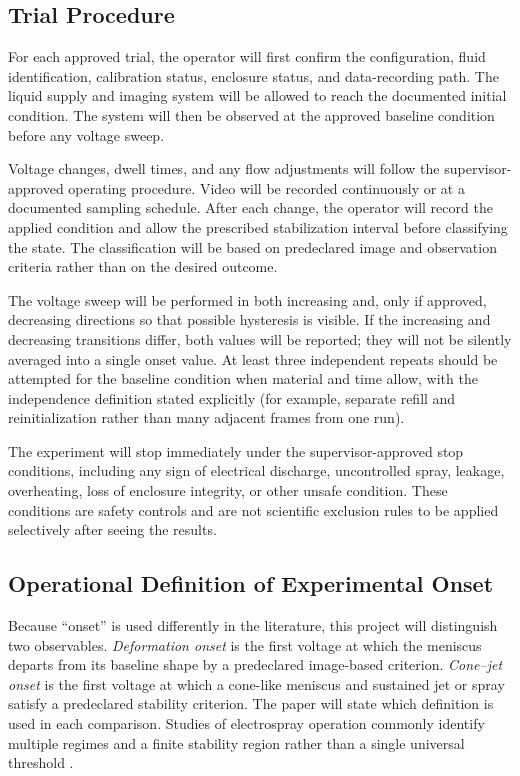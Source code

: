 \subsection{Trial Procedure}

For each approved trial, the operator will first confirm the configuration, fluid identification, calibration status, enclosure status, and data-recording path. The liquid supply and imaging system will be allowed to reach the documented initial condition. The system will then be observed at the approved baseline condition before any voltage sweep.

Voltage changes, dwell times, and any flow adjustments will follow the supervisor-approved operating procedure. Video will be recorded continuously or at a documented sampling schedule. After each change, the operator will record the applied condition and allow the prescribed stabilization interval before classifying the state. The classification will be based on predeclared image and observation criteria rather than on the desired outcome.

The voltage sweep will be performed in both increasing and, only if approved, decreasing directions so that possible hysteresis is visible. If the increasing and decreasing transitions differ, both values will be reported; they will not be silently averaged into a single onset value. At least three independent repeats should be attempted for the baseline condition when material and time allow, with the independence definition stated explicitly (for example, separate refill and reinitialization rather than many adjacent frames from one run).

The experiment will stop immediately under the supervisor-approved stop conditions, including any sign of electrical discharge, uncontrolled spray, leakage, overheating, loss of enclosure integrity, or other unsafe condition. These conditions are safety controls and are not scientific exclusion rules to be applied selectively after seeing the results.

\subsection{Operational Definition of Experimental Onset}

Because ``onset'' is used differently in the literature, this project will distinguish two observables. \emph{Deformation onset} is the first voltage at which the meniscus departs from its baseline shape by a predeclared image-based criterion. \emph{Cone--jet onset} is the first voltage at which a cone-like meniscus and sustained jet or spray satisfy a predeclared stability criterion. The paper will state which definition is used in each comparison. Studies of electrospray operation commonly identify multiple regimes and a finite stability region rather than a single universal threshold \cite{cloupeau1989conejet,cloupeau1994modes,hartman1999electrohydrodynamic,naderi2019curved}.

